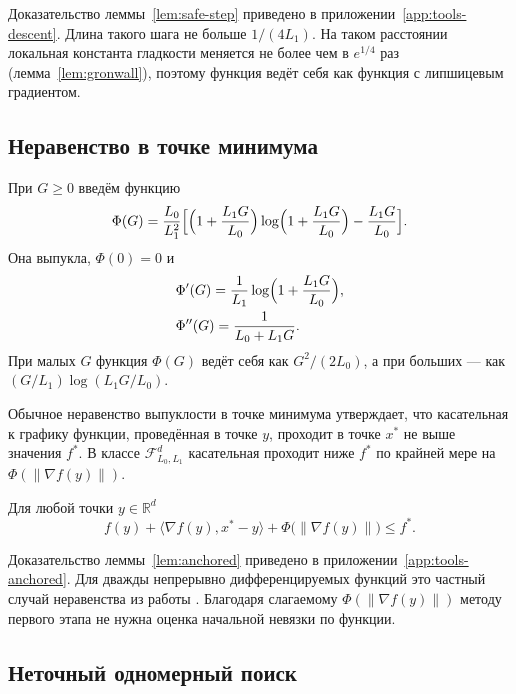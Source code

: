 \documentclass[11pt,a4paper]{article}
\newcommand{\R}{\mathbb R}
\newcommand{\F}{\mathcal F}
\newcommand{\ip}[2]{\langle #1,#2\rangle}
\newcommand{\norm}[1]{\|#1\|}
\begin{document}
Доказательство леммы~\ref{lem:safe-step} приведено в приложении~\ref{app:tools-descent}. Длина такого шага не больше $1/(4L_1)$. На таком расстоянии локальная константа гладкости меняется не более чем в $e^{1/4}$ раз (лемма~\ref{lem:gronwall}), поэтому функция ведёт себя как функция с липшицевым градиентом.

\subsection{Неравенство в точке минимума}\label{sec:upper-anchored}

При $G\ge0$ введём функцию
\begin{equation}\label{eq:Phi}
 \Phi(G)=\frac{L_0}{L_1^2}\Bigl[\Bigl(1+\frac{L_1G}{L_0}\Bigr)\log\Bigl(1+\frac{L_1G}{L_0}\Bigr)-\frac{L_1G}{L_0}\Bigr] .
\end{equation}
Она выпукла, $\Phi(0)=0$ и
\begin{equation}\label{eq:Phi-derivatives}
\begin{aligned}
 &\Phi'(G)=\frac1{L_1}\log\Bigl(1+\frac{L_1G}{L_0}\Bigr),\\
 &\Phi''(G)=\frac1{L_0+L_1G} .
\end{aligned}
\end{equation}
При малых $G$ функция $\Phi(G)$ ведёт себя как $G^2/(2L_0)$, а при больших --- как $(G/L_1)\log(L_1G/L_0)$.

Обычное неравенство выпуклости в точке минимума утверждает, что касательная к графику функции, проведённая в точке $y$, проходит в точке $x^\ast$ не выше значения $f^\ast$. В классе $\F_{L_0,L_1}^d$ касательная проходит ниже $f^\ast$ по крайней мере на $\Phi(\norm{\nabla f(y)})$.

\begin{lemma}\label{lem:anchored}
Для любой точки $y\in\R^d$
\[
 f(y)+\ip{\nabla f(y)}{x^\ast-y}+\Phi\bigl(\norm{\nabla f(y)}\bigr)\le f^\ast .
\]
\end{lemma}

Доказательство леммы~\ref{lem:anchored} приведено в приложении~\ref{app:tools-anchored}. Для дважды непрерывно дифференцируемых функций это частный случай неравенства из работы \citet[лемма~2.7]{vankov2025optimizing}. Благодаря слагаемому $\Phi(\norm{\nabla f(y)})$ методу первого этапа не нужна оценка начальной невязки по функции.

\subsection{Неточный одномерный поиск}\label{sec:upper-search}
\end{document}
